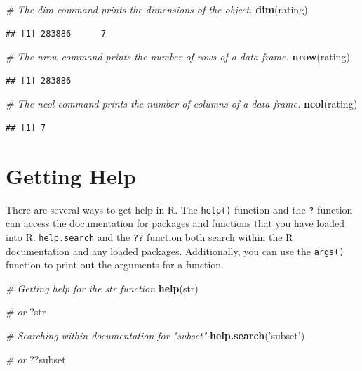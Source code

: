 \documentclass[]{book}
\newenvironment{Shaded}{\begin{snugshade}}{\end{snugshade}}
\newcommand{\KeywordTok}[1]{\textcolor[rgb]{0.13,0.29,0.53}{\textbf{{#1}}}}
\newcommand{\StringTok}[1]{\textcolor[rgb]{0.31,0.60,0.02}{{#1}}}
\newcommand{\CommentTok}[1]{\textcolor[rgb]{0.56,0.35,0.01}{\textit{{#1}}}}
\newcommand{\NormalTok}[1]{{#1}}
\begin{document}
\begin{Shaded}
\begin{Highlighting}[]
\CommentTok{# The dim command prints the dimensions of the object.}
\KeywordTok{dim}\NormalTok{(rating)}
\end{Highlighting}
\end{Shaded}

\begin{verbatim}
## [1] 283886      7
\end{verbatim}

\begin{Shaded}
\begin{Highlighting}[]
\CommentTok{# The nrow command prints the number of rows of a data frame.}
\KeywordTok{nrow}\NormalTok{(rating)}
\end{Highlighting}
\end{Shaded}

\begin{verbatim}
## [1] 283886
\end{verbatim}

\begin{Shaded}
\begin{Highlighting}[]
\CommentTok{# The ncol command prints the number of columns of a data frame.}
\KeywordTok{ncol}\NormalTok{(rating)}
\end{Highlighting}
\end{Shaded}

\begin{verbatim}
## [1] 7
\end{verbatim}

\section{Getting Help}\label{getting-help}

There are several ways to get help in R. The \texttt{help()} function
and the \texttt{?} function can access the documentation for packages
and functions that you have loaded into R. \texttt{help.search} and the
\texttt{??} function both search within the R documentation and any
loaded packages. Additionally, you can use the \texttt{args()} function
to print out the arguments for a function.

\begin{Shaded}
\begin{Highlighting}[]
\CommentTok{# Getting help for the str function}
\KeywordTok{help}\NormalTok{(str)}

\CommentTok{# or}
\NormalTok{?str}

\CommentTok{# Searching within documentation for "subset"}
\KeywordTok{help.search}\NormalTok{(}\StringTok{'subset'}\NormalTok{)}

\CommentTok{# or}
\NormalTok{??subset}
\end{Highlighting}
\end{Shaded}
\end{document}

